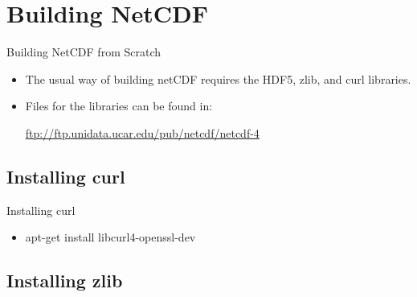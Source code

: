 \documentclass[compress,11pt,xcolor=svgnames,aspectratio=169]{beamer}
\begin{document}
\section{Building NetCDF}

\begin{frame}[fragile]{Building NetCDF from Scratch}

\begin{itemize}

  \item The usual way of building netCDF requires the HDF5, zlib, and curl libraries.

  \item Files for the libraries can be found in:

\begin{center}
\url{ftp://ftp.unidata.ucar.edu/pub/netcdf/netcdf-4}
\end{center}

\end{itemize}

\end{frame}

\subsection{Installing curl}

\begin{frame}[fragile]{Installing curl}

\begin{itemize}

  \item apt-get install libcurl4-openssl-dev

\end{itemize}

\end{frame}

\subsection{Installing zlib}
\end{document}
